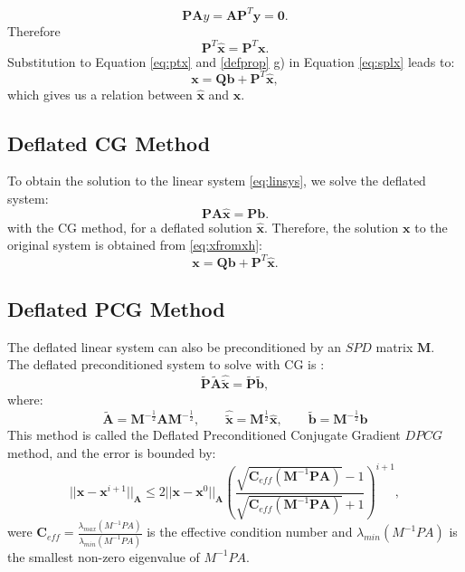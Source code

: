 \documentclass{ecmorXV}
\begin{document}
 \begin{equation*}
 \mathbf{P}\mathbf{A}y=\mathbf{A}\mathbf{P}^T\mathbf{y}=\mathbf{0}.
 \end{equation*}
 Therefore
  \begin{equation}\label{eq:ptx}
\mathbf{P}^T\mathbf{\hat{x}}=\mathbf{P}^T\mathbf{x}.
 \end{equation}
Substitution to Equation \eqref{eq:ptx} and \ref{defprop} g) in Equation \eqref{eq:splx} leads to:
\begin{equation}\label{eq:xfromxh}
    \mathbf{x}=\mathbf{Q}\mathbf{b}+\mathbf{P}^T\mathbf{\hat{x}}, 
\end{equation}
which gives us a relation between $\mathbf{\hat{x}}$ and $\mathbf{x}$.
 
\subsection{Deflated CG Method}
\hspace{0.5cm}To obtain the solution to the linear system \eqref{eq:linsys}, we solve the deflated system:
\begin{equation}\label{eq:deflsys}
    \mathbf{P}\mathbf{A}\hat{\mathbf{x}}=\mathbf{P}\mathbf{b}.
\end{equation}
with the CG method, for a deflated solution $\hat{\mathbf{x}}$. 
Therefore, the solution $\mathbf{x}$ to the original system is obtained from \eqref{eq:xfromxh}:
$$\mathbf{x}=\mathbf{Q}\mathbf{b}+\mathbf{P}^T\hat{\mathbf{x}}.$$
\subsection*{Deflated PCG Method}
The deflated linear system can also be preconditioned by an $SPD$ matrix $\mathbf{M}$.\\
The deflated preconditioned system to solve with CG is \cite[pag. 30]{Tang08}:
$$\tilde{\mathbf{P}} \tilde{\mathbf{A}} \hat{\tilde{\mathbf{x}}}=\tilde{\mathbf{P}}\tilde{\mathbf{b}},$$
where:
\begin{equation*}
 \tilde{\mathbf{A}}=\mathbf{M}^{-\frac{1}{2}}\mathbf{A}\mathbf{M}^{-\frac{1}{2}}, \qquad \hat{\tilde{\mathbf{x}}}=\mathbf{M}^{\frac{1}{2}}\hat{\mathbf{x}}, \qquad
 \tilde{\mathbf{b}}=\mathbf{M}^{-\frac{1}{2}}\mathbf{b}
\end{equation*}
This method is called the Deflated Preconditioned Conjugate Gradient $DPCG$ method, and the error is bounded by:
\begin{equation*}
 ||\mathbf{x}-\mathbf{x}^{i+1}||_\mathbf{A}\leq 2||\mathbf{x}-\mathbf{x}^{0}||_\mathbf{A} \left( \frac{\sqrt{\mathbf{C}_{eff}(\mathbf{M}^{-1}\mathbf{P}\mathbf{A})}-1}{\sqrt{\mathbf{C}_{eff}(\mathbf{M}^{-1}\mathbf{P}\mathbf{A})}+1} \right)^{i+1},
\end{equation*}
were $\mathbf{C}_{eff}=\frac{\lambda_{max}(M^{-1}PA)}{\lambda_{min}(M^{-1}PA)}$ is the effective condition 
number and $\lambda_{min}(M^{-1}PA)$ is the smallest non-zero eigenvalue of $M^{-1}PA$.
\end{document}
